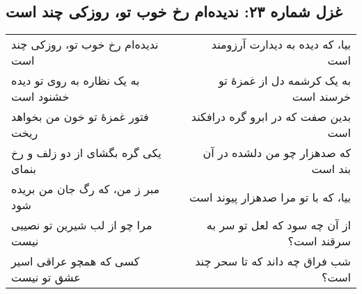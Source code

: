 \begin{center}
\section*{غزل شماره ۲۳: ندیده‌ام رخ خوب تو، روزکی چند است}
\label{sec:023}
\begin{longtable}{l p{0.5cm} r}
ندیده‌ام رخ خوب تو، روزکی چند است
&&
بیا، که دیده به دیدارت آرزومند است
\\
به یک نظاره به روی تو دیده خشنود است
&&
به یک کرشمه دل از غمزهٔ تو خرسند است
\\
فتور غمزهٔ تو خون من بخواهد ریخت
&&
بدین صفت که در ابرو گره درافکند است
\\
یکی گره بگشای از دو زلف و رخ بنمای
&&
که صدهزار چو من دلشده در آن بند است
\\
مبر ز من، که رگ جان من بریده شود
&&
بیا، که با تو مرا صدهزار پیوند است
\\
مرا چو از لب شیرین تو نصیبی نیست
&&
از آن چه سود که لعل تو سر به سرقند است؟
\\
کسی که همچو عراقی اسیر عشق تو نیست
&&
شب فراق چه داند که تا سحر چند است؟
\\
\end{longtable}
\end{center}
